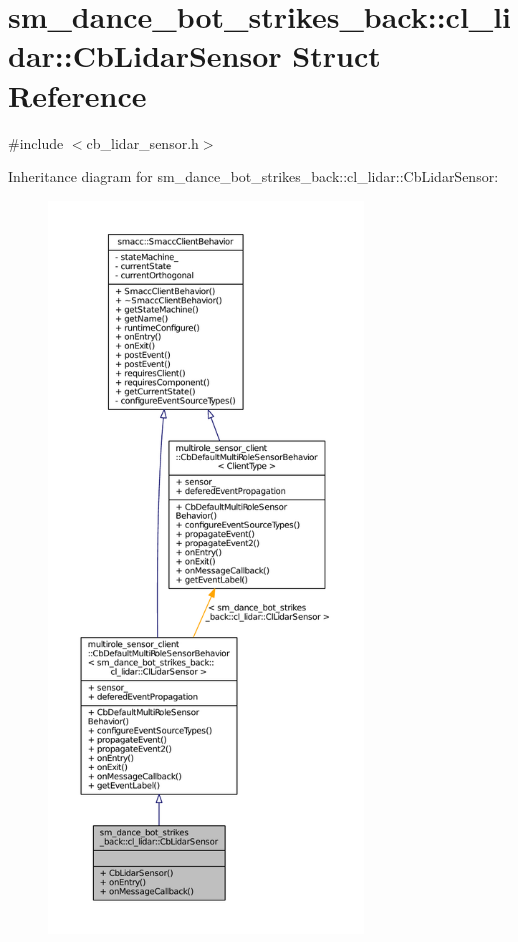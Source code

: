 \hypertarget{structsm__dance__bot__strikes__back_1_1cl__lidar_1_1CbLidarSensor}{}\section{sm\+\_\+dance\+\_\+bot\+\_\+strikes\+\_\+back\+:\+:cl\+\_\+lidar\+:\+:Cb\+Lidar\+Sensor Struct Reference}
\label{structsm__dance__bot__strikes__back_1_1cl__lidar_1_1CbLidarSensor}


{\ttfamily \#include $<$cb\+\_\+lidar\+\_\+sensor.\+h$>$}



Inheritance diagram for sm\+\_\+dance\+\_\+bot\+\_\+strikes\+\_\+back\+:\+:cl\+\_\+lidar\+:\+:Cb\+Lidar\+Sensor\+:
\nopagebreak
\begin{figure}[H]
\begin{center}
\leavevmode
\includegraphics[height=550pt]{structsm__dance__bot__strikes__back_1_1cl__lidar_1_1CbLidarSensor__inherit__graph}
\end{center}
\end{figure}


